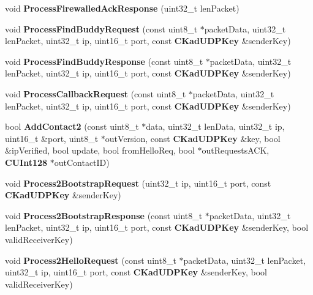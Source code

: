 \begin{DoxyCompactItemize}
\item 
void {\bfseries ProcessFirewalledAckResponse} (uint32\_\-t lenPacket)\label{classKademlia_1_1CKademliaUDPListener_a7f49131ae845a208670612a2692f5c93}

\item 
void {\bfseries ProcessFindBuddyRequest} (const uint8\_\-t $\ast$packetData, uint32\_\-t lenPacket, uint32\_\-t ip, uint16\_\-t port, const {\bf CKadUDPKey} \&senderKey)\label{classKademlia_1_1CKademliaUDPListener_a9a38d245339708e2127717a416b0ea45}

\item 
void {\bfseries ProcessFindBuddyResponse} (const uint8\_\-t $\ast$packetData, uint32\_\-t lenPacket, uint32\_\-t ip, uint16\_\-t port, const {\bf CKadUDPKey} \&senderKey)\label{classKademlia_1_1CKademliaUDPListener_a853ef27edfb8f7d2793cf6edf736a52f}

\item 
void {\bfseries ProcessCallbackRequest} (const uint8\_\-t $\ast$packetData, uint32\_\-t lenPacket, uint32\_\-t ip, uint16\_\-t port, const {\bf CKadUDPKey} \&senderKey)\label{classKademlia_1_1CKademliaUDPListener_adcf09b291af8eeb31c8c2b8928823006}

\item 
bool {\bfseries AddContact2} (const uint8\_\-t $\ast$data, uint32\_\-t lenData, uint32\_\-t ip, uint16\_\-t \&port, uint8\_\-t $\ast$outVersion, const {\bf CKadUDPKey} \&key, bool \&ipVerified, bool update, bool fromHelloReq, bool $\ast$outRequestsACK, {\bf CUInt128} $\ast$outContactID)\label{classKademlia_1_1CKademliaUDPListener_ab8e7860f3c6773df18fe13e888f5bf90}

\item 
void {\bfseries Process2BootstrapRequest} (uint32\_\-t ip, uint16\_\-t port, const {\bf CKadUDPKey} \&senderKey)\label{classKademlia_1_1CKademliaUDPListener_aa842082ac7c584abd95a52c3288d1c3f}

\item 
void {\bfseries Process2BootstrapResponse} (const uint8\_\-t $\ast$packetData, uint32\_\-t lenPacket, uint32\_\-t ip, uint16\_\-t port, const {\bf CKadUDPKey} \&senderKey, bool validReceiverKey)\label{classKademlia_1_1CKademliaUDPListener_a8ce943e108e98c4e116dee1a65a27f63}

\item 
void {\bfseries Process2HelloRequest} (const uint8\_\-t $\ast$packetData, uint32\_\-t lenPacket, uint32\_\-t ip, uint16\_\-t port, const {\bf CKadUDPKey} \&senderKey, bool validReceiverKey)\label{classKademlia_1_1CKademliaUDPListener_a2335371f4c4cb1819d12bca2d8977eda}


\end{DoxyCompactItemize}
